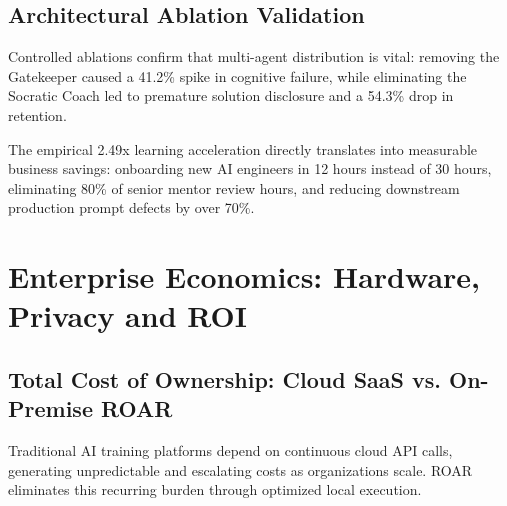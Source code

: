 \documentclass[11pt,a4paper]{article}
\begin{document}
\subsection{Architectural Ablation Validation}
Controlled ablations confirm that multi-agent distribution is vital: removing the Gatekeeper caused a 41.2\% spike in cognitive failure, while eliminating the Socratic Coach led to premature solution disclosure and a 54.3\% drop in retention.

\vspace{2pt}
\begin{highlightbox}[title=Corporate ROI: Measurable Productivity Multiplication]
The empirical 2.49x learning acceleration directly translates into measurable business savings: onboarding new AI engineers in 12 hours instead of 30 hours, eliminating 80\% of senior mentor review hours, and reducing downstream production prompt defects by over 70\%.
\end{highlightbox}

\newpage


\section{Enterprise Economics: Hardware, Privacy and ROI}

\subsection{Total Cost of Ownership: Cloud SaaS vs. On-Premise ROAR}
Traditional AI training platforms depend on continuous cloud API calls, generating unpredictable and escalating costs as organizations scale. ROAR eliminates this recurring burden through optimized local execution.
\end{document}
